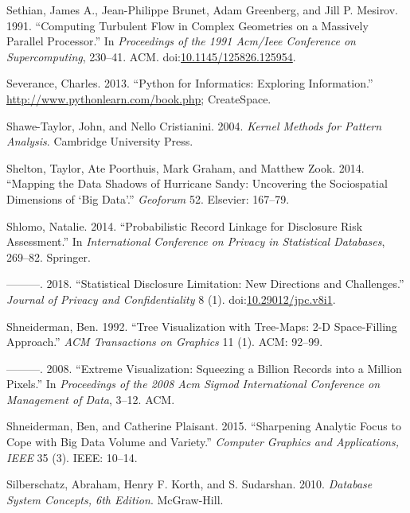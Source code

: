 \documentclass[]{krantz}
\begin{document}
\hypertarget{ref-bigdata_old1}{}
Sethian, James A., Jean-Philippe Brunet, Adam Greenberg, and Jill P.
Mesirov. 1991. ``Computing Turbulent Flow in Complex Geometries on a
Massively Parallel Processor.'' In \emph{Proceedings of the 1991
Acm/Ieee Conference on Supercomputing}, 230--41. ACM.
doi:\href{https://doi.org/10.1145/125826.125954}{10.1145/125826.125954}.

\hypertarget{ref-SeverancePython}{}
Severance, Charles. 2013. ``Python for Informatics: Exploring
Information.'' \url{http://www.pythonlearn.com/book.php}; CreateSpace.

\hypertarget{ref-ShaweTaylor2004}{}
Shawe-Taylor, John, and Nello Cristianini. 2004. \emph{Kernel Methods
for Pattern Analysis}. Cambridge University Press.

\hypertarget{ref-shelton2014mapping}{}
Shelton, Taylor, Ate Poorthuis, Mark Graham, and Matthew Zook. 2014.
``Mapping the Data Shadows of Hurricane Sandy: Uncovering the
Sociospatial Dimensions of `Big Data'.'' \emph{Geoforum} 52. Elsevier:
167--79.

\hypertarget{ref-shlomo2014probabilistic}{}
Shlomo, Natalie. 2014. ``Probabilistic Record Linkage for Disclosure
Risk Assessment.'' In \emph{International Conference on Privacy in
Statistical Databases}, 269--82. Springer.

\hypertarget{ref-shlomo2018}{}
---------. 2018. ``Statistical Disclosure Limitation: New Directions and
Challenges.'' \emph{Journal of Privacy and Confidentiality} 8 (1).
doi:\href{https://doi.org/10.29012/jpc.v8i1}{10.29012/jpc.v8i1}.

\hypertarget{ref-shneiderman1992tree}{}
Shneiderman, Ben. 1992. ``Tree Visualization with Tree-Maps: 2-D
Space-Filling Approach.'' \emph{ACM Transactions on Graphics} 11 (1).
ACM: 92--99.

\hypertarget{ref-shneiderman2008extreme}{}
---------. 2008. ``Extreme Visualization: Squeezing a Billion Records
into a Million Pixels.'' In \emph{Proceedings of the 2008 Acm Sigmod
International Conference on Management of Data}, 3--12. ACM.

\hypertarget{ref-shneiderman2015sharpening}{}
Shneiderman, Ben, and Catherine Plaisant. 2015. ``Sharpening Analytic
Focus to Cope with Big Data Volume and Variety.'' \emph{Computer
Graphics and Applications, IEEE} 35 (3). IEEE: 10--14.

\hypertarget{ref-silberschatz2010database}{}
Silberschatz, Abraham, Henry F. Korth, and S. Sudarshan. 2010.
\emph{Database System Concepts, 6th Edition}. McGraw-Hill.
\end{document}
